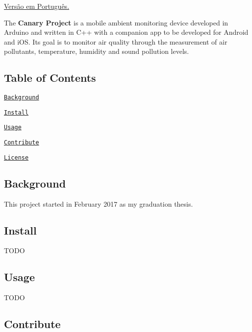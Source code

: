 \href{https://github.com/RichardLitt/standard-readme}{\tt } \href{https://travis-ci.org/dpoltronieri/Canary}{\tt } \href{https://codeclimate.com/github/dpoltronieri/Canary}{\tt } \href{https://codeclimate.com/github/dpoltronieri/Canary/coverage}{\tt } \href{https://codeclimate.com/github/dpoltronieri/Canary}{\tt }

\hyperlink{md_README_PTBR}{Versão em Português.}

The {\bfseries Canary Project} is a mobile ambient monitoring device developed in Arduino and written in C++ with a companion app to be developed for Android and i\+OS. Its goal is to monitor air quality through the measurement of air pollutants, temperature, humidity and sound pollution levels.

\subsection*{Table of Contents}


\begin{DoxyItemize}
\item \href{#background}{\tt Background}
\item \href{#install}{\tt Install}
\item \href{#usage}{\tt Usage}
\item \href{#contribute}{\tt Contribute}
\item \href{#license}{\tt License}
\end{DoxyItemize}

\subsection*{Background}

This project started in February 2017 as my graduation thesis.

\subsection*{Install}

T\+O\+DO

\subsection*{Usage}

T\+O\+DO

\subsection*{Contribute}

